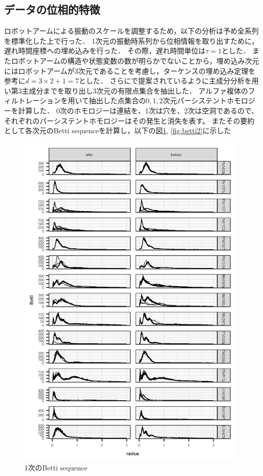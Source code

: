 \documentclass{jarticle}
\begin{document}
\subsection{データの位相的特徴}
ロボットアームによる振動のスケールを調整するため，以下の分析は予め全系列を標準化した上で行った．
1次元の振動時系列から位相情報を取り出すために，遅れ時間座標への埋め込みを行った．
その際，遅れ時間単位は$\tau = 1$とした．
またロボットアームの構造や状態変数の数が明らかでないことから，埋め込み次元にはロボットアームが3次元であることを考慮し，ターケンスの埋め込み定理\cite{Takens1981}を参考に$d = 3\times2 + 1 = 7$とした．
さらに\cite{Truong2017}で提案されているように主成分分析を用い第3主成分までを取り出し3次元の有限点集合を抽出した．
アルファ複体のフィルトレーションを用いて抽出した点集合の$0,1,2$次元パーシステントホモロジーを計算した．
0次のホモロジーは連結を、1次は穴を、2次は空洞であるので、それぞれのパーシステントホモロジーはその発生と消失を表す。
またその要約として各次元のBetti sequenceを計算し，以下の図\ref{fig:betti1}, \ref{fig:betti2}に示した

\begin{figure}[htbp]
\begin{center}
	\includegraphics[width=11cm]{fig/betti_1.png}	
	\caption{1次のBetti sequence}\label{fig:betti1}
\end{center}
\end{figure}
\end{document}
